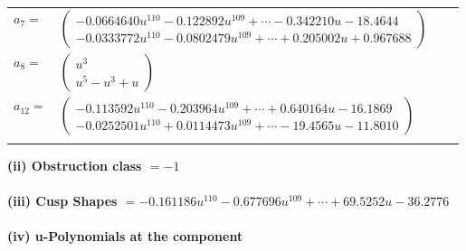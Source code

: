 \documentclass[1p]{elsarticle_modified}
\theoremstyle{definition}
\begin{document}
\begin{tabular}{m{7pt} m{180pt} m{7pt} m{180pt} }
\flushright $a_{7}=$&$\begin{pmatrix}-0.0664640 u^{110}-0.122892 u^{109}+\cdots-0.342210 u-18.4644\\-0.0333772 u^{110}-0.0802479 u^{109}+\cdots+0.205002 u+0.967688\end{pmatrix}$ \\
\flushright $a_{8}=$&$\begin{pmatrix}u^3\\u^5- u^3+u\end{pmatrix}$ \\
\flushright $a_{12}=$&$\begin{pmatrix}-0.113592 u^{110}-0.203964 u^{109}+\cdots+0.640164 u-16.1869\\-0.0252501 u^{110}+0.0114473 u^{109}+\cdots-19.4565 u-11.8010\end{pmatrix}$\\&\end{tabular}
\flushleft \textbf{(ii) Obstruction class $= -1$}\\~\\
\flushleft \textbf{(iii) Cusp Shapes $= -0.161186 u^{110}-0.677696 u^{109}+\cdots+69.5252 u-36.2776$}\\~\\
\newpage\renewcommand{\arraystretch}{1}
\flushleft \textbf{(iv) u-Polynomials at the component}\newline \\
\end{document}
